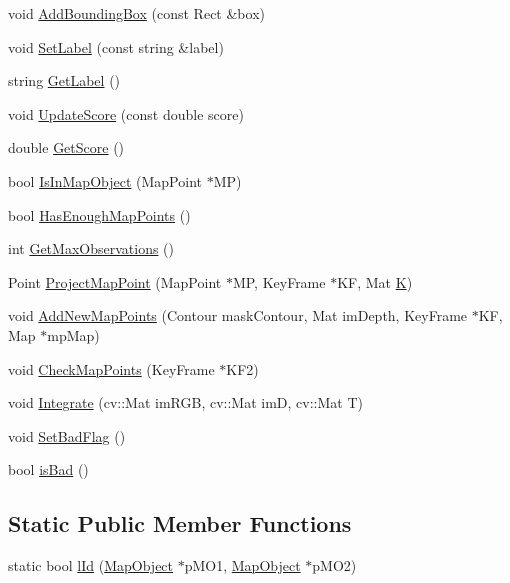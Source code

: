\begin{DoxyCompactItemize}
\item 
void \hyperlink{classMapObject_a30ead6a239418378c5f2661981180388}{Add\+Bounding\+Box} (const Rect \&box)
\item 
void \hyperlink{classMapObject_a522a2f30d5725000973fe11a25eadd9a}{Set\+Label} (const string \&label)
\item 
string \hyperlink{classMapObject_a4e3542c7500cc46a15d95562fabaee98}{Get\+Label} ()
\item 
void \hyperlink{classMapObject_ab7aa5a6515739cff4a66c10f9a0dccb6}{Update\+Score} (const double score)
\item 
double \hyperlink{classMapObject_a0e64406350f6179b384ec2e32219c51b}{Get\+Score} ()
\item 
bool \hyperlink{classMapObject_a27ab648a8c744e127ea890424eda85cb}{Is\+In\+Map\+Object} (Map\+Point $\ast$MP)
\item 
bool \hyperlink{classMapObject_a1895c05abe4797eafa71a7cf02098175}{Has\+Enough\+Map\+Points} ()
\item 
int \hyperlink{classMapObject_a8991e2fb765719d3f7b56a41f53c9801}{Get\+Max\+Observations} ()
\item 
Point \hyperlink{classMapObject_ab1adda5206f585c9a6a3694f40a29baa}{Project\+Map\+Point} (Map\+Point $\ast$MP, Key\+Frame $\ast$KF, Mat \hyperlink{classMapObject_adee82f6f637c2dbb2d790656a4197433}{K})
\item 
void \hyperlink{classMapObject_a7018da5585ff1eaf921fd3f144c65279}{Add\+New\+Map\+Points} (Contour mask\+Contour, Mat im\+Depth, Key\+Frame $\ast$KF, Map $\ast$mp\+Map)
\item 
void \hyperlink{classMapObject_aa8155e5801858b0f7ba993e6393f89d3}{Check\+Map\+Points} (Key\+Frame $\ast$K\+F2)
\item 
void \hyperlink{classMapObject_a7e7629688e3d093cfbc1a49ad2f11edc}{Integrate} (cv\+::\+Mat im\+R\+GB, cv\+::\+Mat imD, cv\+::\+Mat T)
\item 
void \hyperlink{classMapObject_a9532c72bbff36ff2d89f5bb978bd889e}{Set\+Bad\+Flag} ()
\item 
bool \hyperlink{classMapObject_ad6ca4c22437af291659463fcaf920183}{is\+Bad} ()
\end{DoxyCompactItemize}
\subsection*{Static Public Member Functions}
\begin{DoxyCompactItemize}
\item 
static bool \hyperlink{classMapObject_a23534cbf378a586e600a90ca2b000606}{l\+Id} (\hyperlink{classMapObject}{Map\+Object} $\ast$p\+M\+O1, \hyperlink{classMapObject}{Map\+Object} $\ast$p\+M\+O2)
\end{DoxyCompactItemize}
